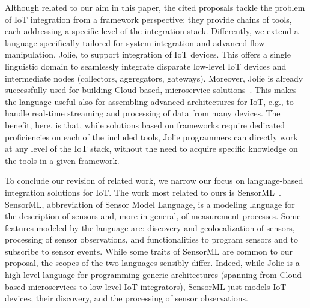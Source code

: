 Although related to our aim in this paper, the cited proposals tackle the
problem of IoT integration from a framework perspective: they provide chains of
tools, each addressing a specific level of the integration stack. Differently,
we extend a language specifically tailored for system integration and advanced
flow manipulation, Jolie, to support integration of IoT devices. This offers a
single linguistic domain to seamlessly integrate disparate low-level IoT devices
and intermediate nodes (collectors, aggregators, gateways). Moreover, Jolie is
already successfully used for building Cloud-based, microservice
solutions~\cite{GabbrielliGGMM16,MelisPGC17}. This makes the language useful
also for assembling advanced architectures for IoT, e.g., to handle real-time
streaming and processing of data from many devices. The benefit, here, is that,
while solutions based on frameworks require dedicated proficiencies on each of
the included tools, Jolie programmers can directly work at any level of the IoT
stack, without the need to acquire specific knowledge on the tools in a given
framework.

To conclude our revision of related work, we narrow our focus on language-based
integration solutions for IoT. The work most related to ours is
SensorML~\cite{SensorML}.
%
SensorML, abbreviation of Sensor Model Language, is a modeling
language for the description of sensors and, more in general, of measurement
processes. Some features modeled by the language are: discovery and
geolocalization of sensors, processing of sensor observations, and
functionalities to program sensors and to subscribe to sensor events.
%
While some traits of SensorML are common to our proposal, the scopes of the two
languages sensibly differ. Indeed, while Jolie is a high-level language for
programming generic architectures (spanning from Cloud-based microservices to
low-level IoT integrators), SensorML just models IoT devices, their discovery,
and the processing of sensor observations.

%
